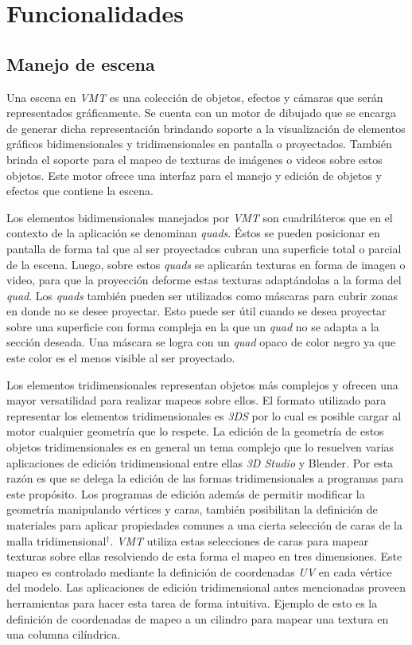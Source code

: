 \section{Funcionalidades}

\subsection{Manejo de escena}

Una escena en \emph{VMT} es una colección de objetos, efectos y cámaras que serán representados gráficamente.
Se cuenta con un motor de dibujado que se encarga de generar dicha representación brindando soporte a la visualización de elementos gráficos bidimensionales y tridimensionales en pantalla o proyectados. También brinda el soporte para el mapeo de texturas de imágenes o videos sobre estos objetos.
Este motor ofrece una interfaz para el manejo y edición de objetos y efectos que contiene la escena.

Los elementos bidimensionales manejados por \emph{VMT} son cuadriláteros que en el contexto de la aplicación se denominan \emph{quads}. Éstos se pueden posicionar en pantalla de forma tal que al ser proyectados cubran una superficie total o parcial de la escena. Luego, sobre estos \emph{quads} se aplicarán texturas en forma de imagen o video, para que la proyección deforme estas texturas adaptándolas a la forma del \emph{quad}.
Los \emph{quads} también pueden ser utilizados como máscaras para cubrir zonas en donde no se desee proyectar. Esto puede ser útil cuando se desea proyectar sobre una superficie con forma compleja en la que un \emph{quad} no se adapta a la sección deseada. Una máscara se logra con un \emph{quad} opaco de color negro ya que este color es el menos visible al ser proyectado.

Los elementos tridimensionales representan objetos más complejos y ofrecen una mayor versatilidad para realizar mapeos sobre ellos.
El formato utilizado para representar los elementos tridimensionales es \emph{3DS}\cite{3DS} por lo cual es posible cargar al motor cualquier geometría que lo respete.
La edición de la geometría de estos objetos tridimensionales es en general un tema complejo que lo resuelven varias aplicaciones de edición tridimensional entre ellas \emph{3D Studio}\cite{3DStudioMax} y Blender\cite{Blender}. Por esta razón es que se delega la edición de las formas tridimensionales a programas para este propósito.
Los programas de edición además de permitir modificar la geometría manipulando vértices y caras, también posibilitan la definición de materiales para aplicar propiedades comunes a una cierta selección de caras de la malla tridimensional$^\dagger$.
\emph{VMT} utiliza estas selecciones de caras para mapear texturas sobre ellas resolviendo de esta forma el mapeo en tres dimensiones. Este mapeo es controlado mediante la definición de coordenadas \emph{UV} en cada vértice del modelo. Las aplicaciones de edición tridimensional antes mencionadas proveen herramientas para hacer esta tarea de forma intuitiva. Ejemplo de esto es la definición de coordenadas de mapeo a un cilindro para mapear una textura en una columna cilíndrica.

